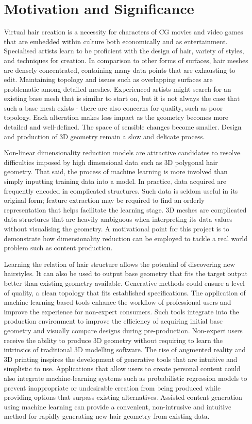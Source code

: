 \documentclass[ %
author={Dillon Keith Diep},
supervisor={Dr. Carl Henrik Ek},
degree={MEng},
title={ART-CG:},
subtitle={Assisted Real-time Content Generation of 3D Hair by Learning Manifolds},
type={Research},
year={2017} ]{dissertation}
\begin{document}
\section{Motivation and Significance}
Virtual hair creation is a necessity for characters of CG movies and video games that are embedded within culture both economically and as entertainment. Specialised artists learn to be proficient with the design of hair, variety of styles, and techniques for creation. In comparison to other forms of surfaces, hair meshes are densely concentrated, containing many data points that are exhausting to edit. Maintaining topology and issues such as overlapping surfaces are problematic among detailed meshes. Experienced artists might search for an existing base mesh that is similar to start on, but it is not always the case that such a base mesh exists - there are also concerns for quality, such as poor topology. Each alteration makes less impact as the geometry becomes more detailed and well-defined. The space of sensible changes become smaller. Design and production of 3D geometry remain a slow and delicate process.

Non-linear dimensionality reduction models are attractive candidates to resolve difficulties imposed by high dimensional data such as 3D polygonal hair geometry. That said, the process of machine learning is more involved than simply inputting training data into a model. In practice, data acquired are frequently encoded in complicated structures. Such data is seldom useful in its original form; feature extraction may be required to find an orderly representation that helps facilitate the learning stage. 3D meshes are complicated data structures that are heavily ambiguous when interpreting its data values without visualising the geometry. A motivational point for this project is to demonstrate how dimensionality reduction can be employed to tackle a real world problem such as content production.

Learning the relation of hair structure allows the potential of discovering new hairstyles.  It can also be used to output base geometry that fits the target output better than existing geometry available. Generative methods could ensure a level of quality, a clean topology that fits established specifications. The application of machine-learning based tools enhance the workflow of professional users and improve the experience for non-expert consumers. Such tools integrate into the production environment to improve the efficiency of acquiring initial base geometry and visually compare designs during pre-production. Non-expert users receive the ability to produce 3D geometry without requiring to learn the intrinsics of traditional 3D modelling software. The rise of augmented reality and 3D printing inspires the development of generative tools that are intuitive and simplistic to use. Applications that allow users to create personal content could also integrate machine-learning systems such as probabilistic regression models to prevent inappropriate or undesirable creation from being produced while providing options that surpass existing alternatives. Assisted content generation using machine learning can provide a convenient, non-intrusive and intuitive method for rapidly generating new hair geometry from existing data.
\end{document}
